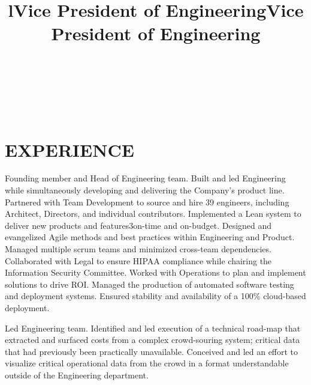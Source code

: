 \documentclass[margin]{res}
\begin{document}
\bigskip

\address{2263 Derby St.\\ken@hero.com}
\address{Berkeley, CA 94705\\(310) 383}

\begin{resume}

\begin{format}
\title{l}\\
\\
\body\\
\end{format}

\section{EXPERIENCE}
\title{\textbf{Vice President of Engineering}}
\begin{position}
\hspace*{.5cm}Founding member and Head of Engineering team.  Built and led Engineering while simultaneously developing and delivering the Company's product line. Partnered with Team Development to source and hire 39 engineers, including Architect, Directors, and individual contributors.  Implemented a Lean system to deliver new products and features3\textemdash on-time and on-budget. Designed and evangelized Agile methods and best practices within Engineering and Product. Managed multiple scrum teams and minimized cross-team dependencies.  Collaborated with Legal to ensure HIPAA compliance while chairing the Information Security Committee.  Worked with Operations to plan and implement solutions to drive ROI.  Managed the production of automated software testing and deployment systems.  Ensured stability and availability of a 100\% cloud-based deployment.
\end{position}

\title{\textbf{Vice President of Engineering}}
\begin{position}
\hspace*{.5cm}Led Engineering team. Identified and led execution of a technical road-map that extracted and surfaced costs from a complex crowd-souring system; critical data that had previously been practically unavailable. Conceived and led an effort to visualize critical operational data from the crowd in a format understandable outside of the Engineering department.
\end{position}


\end{resume}
\end{document}
